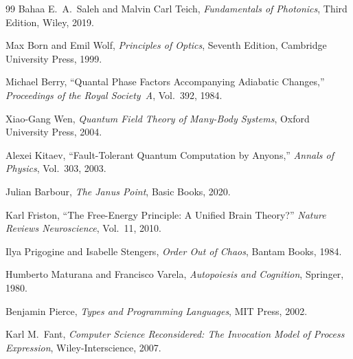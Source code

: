 \documentclass[11pt,openany]{book}
\theoremstyle{definition}
\theoremstyle{plain}
\begin{document}
\begin{thebibliography}{99}
Bahaa E.\ A.\ Saleh and Malvin Carl Teich,
\textit{Fundamentals of Photonics}, Third Edition,
Wiley, 2019.

Max Born and Emil Wolf,
\textit{Principles of Optics}, Seventh Edition,
Cambridge University Press, 1999.

Michael Berry,
``Quantal Phase Factors Accompanying Adiabatic Changes,''
\textit{Proceedings of the Royal Society~A}, Vol.~392, 1984.

Xiao-Gang Wen,
\textit{Quantum Field Theory of Many-Body Systems},
Oxford University Press, 2004.

Alexei Kitaev,
``Fault-Tolerant Quantum Computation by Anyons,''
\textit{Annals of Physics}, Vol.~303, 2003.

Julian Barbour,
\textit{The Janus Point},
Basic Books, 2020.

Karl Friston,
``The Free-Energy Principle: A Unified Brain Theory?''
\textit{Nature Reviews Neuroscience}, Vol.~11, 2010.

Ilya Prigogine and Isabelle Stengers,
\textit{Order Out of Chaos},
Bantam Books, 1984.

Humberto Maturana and Francisco Varela,
\textit{Autopoiesis and Cognition},
Springer, 1980.

Benjamin Pierce,
\textit{Types and Programming Languages},
MIT Press, 2002.

Karl M.\ Fant,
\textit{Computer Science Reconsidered: The Invocation Model of Process Expression},
Wiley-Interscience, 2007.

\end{thebibliography}
\end{document}
